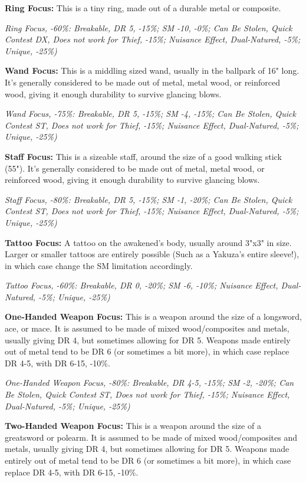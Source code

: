 \begin{multicols*}{2}
	\textbf{Ring Focus:} This is a tiny ring, made out of a durable metal or composite.
	
	\textcolor{OliveGreen}{\textit{Ring Focus, -60\%: Breakable, DR 5, -15\%; SM -10, -0\%; Can Be Stolen, Quick Contest DX, Does not work for Thief, -15\%; Nuisance Effect, Dual-Natured, -5\%; Unique, -25\%)}}
	
	\textbf{Wand Focus:} This is a middling sized wand, usually in the ballpark of 16" long. It's generally considered to be made out of metal, metal wood, or reinforced wood, giving it enough durability to survive glancing blows.
	
	\textcolor{OliveGreen}{\textit{Wand Focus, -75\%: Breakable, DR 5, -15\%; SM -4, -15\%; Can Be Stolen, Quick Contest ST, Does not work for Thief, -15\%; Nuisance Effect, Dual-Natured, -5\%; Unique, -25\%)}}
	
	\textbf{Staff Focus:} This is a sizeable staff, around the size of a good walking stick (55"). It's generally considered to be made out of metal, metal wood, or reinforced wood, giving it enough durability to survive glancing blows.
	
	\textcolor{OliveGreen}{\textit{Staff Focus, -80\%: Breakable, DR 5, -15\%; SM -1, -20\%; Can Be Stolen, Quick Contest ST, Does not work for Thief, -15\%; Nuisance Effect, Dual-Natured, -5\%; Unique, -25\%)}}
	
	\textbf{Tattoo Focus:} A tattoo on the awakened's body, usually around 3"x3" in size. Larger or smaller tattoos are entirely possible (Such as a Yakuza's entire sleeve!), in which case change the SM limitation accordingly.
	
	\textcolor{OliveGreen}{\textit{Tattoo Focus, -60\%: Breakable, DR 0, -20\%; SM -6, -10\%; Nuisance Effect, Dual-Natured, -5\%; Unique, -25\%)}}
	
	\textbf{One-Handed Weapon Focus:} This is a weapon around the size of a longsword, ace, or mace. It is assumed to be made of mixed wood/composites and metals, usually giving DR 4, but sometimes allowing for DR 5. Weapons made entirely out of metal tend to be DR 6 (or sometimes a bit more), in which case replace DR 4-5, with DR 6-15, -10\%.
	
	\textcolor{OliveGreen}{\textit{One-Handed Weapon Focus, -80\%: Breakable, DR 4-5, -15\%; SM -2, -20\%; Can Be Stolen, Quick Contest ST, Does not work for Thief, -15\%; Nuisance Effect, Dual-Natured, -5\%; Unique, -25\%)}}
	
	\textbf{Two-Handed Weapon Focus:} This is a weapon around the size of a greatsword or polearm. It is assumed to be made of mixed wood/composites and metals, usually giving DR 4, but sometimes allowing for DR 5. Weapons made entirely out of metal tend to be DR 6 (or sometimes a bit more), in which case replace DR 4-5, with DR 6-15, -10\%.
	

\end{multicols*}

